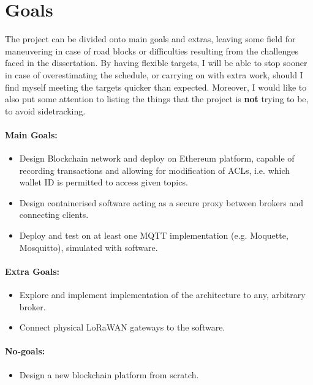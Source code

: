 \documentclass[a4paper,12pt]{article}
\begin{document}
\section*{Goals}

The project can be divided onto main goals and extras, leaving some field for maneuvering in case of road blocks or difficulties resulting from the challenges faced in the dissertation. By having flexible targets, I will be able to stop sooner in case of overestimating the schedule, or carrying on with extra work, should I find myself meeting the targets quicker than expected. Moreover, I would like to also put some attention to listing the things that the project is \textbf{not} trying to be, to avoid sidetracking.

\paragraph{Main Goals:}
\begin{itemize}
  \item Design Blockchain network and deploy on Ethereum platform, capable of recording transactions and allowing for modification of ACLs, i.e. which wallet ID is permitted to access given topics.
  \item Design containerised software acting as a secure proxy between brokers and connecting clients.
  \item Deploy and test on at least one MQTT implementation (e.g. Moquette, Mosquitto), simulated with software.
\end{itemize}

\paragraph{Extra Goals:}
\begin{itemize}
  \item Explore and implement implementation of the architecture to any, arbitrary broker.
  \item Connect physical LoRaWAN gateways to the software.
\end{itemize}

\paragraph{No-goals:}
\begin{itemize}
  \item Design a new blockchain platform from scratch.
\end{itemize}
\end{document}

